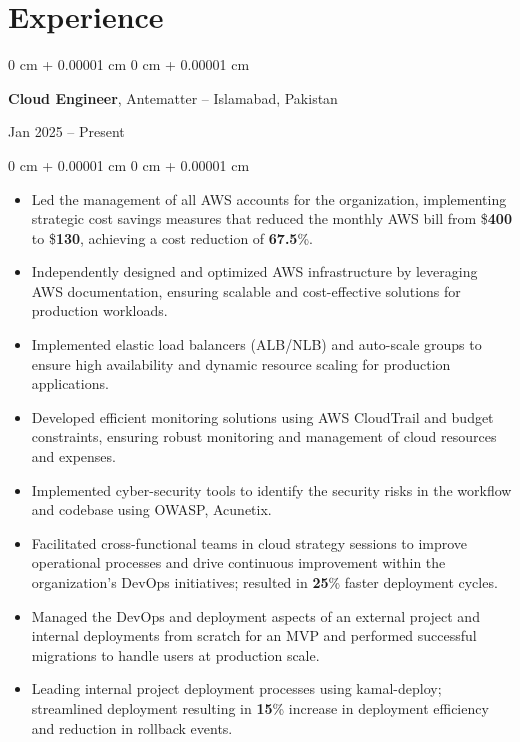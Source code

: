 \documentclass[10pt, letterpaper]{article}
\newenvironment{highlights}{
    \begin{itemize}[
        topsep=0.10 cm,
        parsep=0.10 cm,
        partopsep=0pt,
        itemsep=0pt,
        leftmargin=0 cm + 10pt
    ]
}{
    \end{itemize}
}
\newenvironment{onecolentry}{
    \begin{adjustwidth}{
        0 cm + 0.00001 cm
    }{
        0 cm + 0.00001 cm
    }
}{
    \end{adjustwidth}
}
\newenvironment{twocolentry}[2][]{
    \onecolentry
    \def\secondColumn{#2}
    \setcolumnwidth{\fill, 4.5 cm}
    \begin{paracol}{2}
}{
    \switchcolumn \raggedleft \secondColumn
    \end{paracol}
    \endonecolentry
}
\begin{document}
\section{Experience}
\begin{twocolentry}{Jan 2025 -- Present}
    \textbf{Cloud Engineer}, Antematter -- Islamabad, Pakistan
\end{twocolentry}
\vspace{0.10 cm}
\begin{onecolentry}
    \begin{highlights}
        \item Led the management of all AWS accounts for the organization, implementing strategic cost savings measures that reduced the monthly AWS bill from \$\textbf{400} to \$\textbf{130}, achieving a cost reduction of \textbf{67.5}\%.
        \item Independently designed and optimized AWS infrastructure by leveraging AWS documentation, ensuring scalable and cost-effective solutions for production workloads.
        \item Implemented elastic load balancers (ALB/NLB) and auto-scale groups to ensure high availability and dynamic resource scaling for production applications.
        \item Developed efficient monitoring solutions using AWS CloudTrail and budget constraints, ensuring robust monitoring and management of cloud resources and expenses.
        \item Implemented cyber-security tools to identify the security risks in the workflow and codebase using OWASP, Acunetix.
        \item Facilitated cross-functional teams in cloud strategy sessions to improve operational processes and drive continuous improvement within the organization's DevOps initiatives; resulted in \textbf{25}\% faster deployment cycles.
        \item Managed the DevOps and deployment aspects of an external project and internal deployments from scratch for an MVP and performed successful migrations to handle users at production scale.
        \item Leading internal project deployment processes using kamal-deploy; streamlined deployment resulting in \textbf{15}\% increase in deployment efficiency and reduction in rollback events.
    \end{highlights}
\end{onecolentry}

\vspace{0.10 cm}
\end{document}
